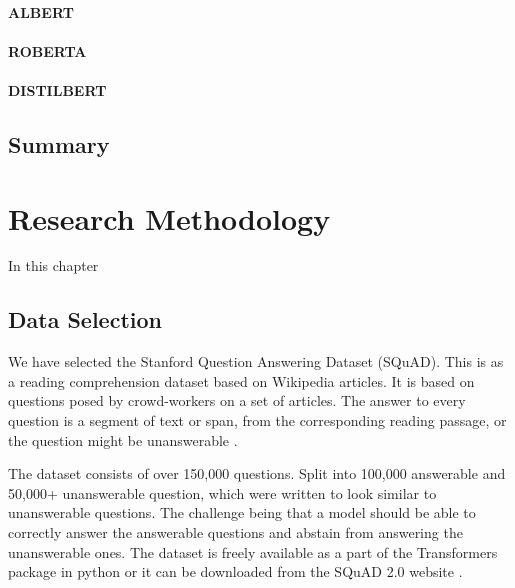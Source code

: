 \documentclass[a4paper,12pt]{report}
\begin{document}
	       \subsubsection{ALBERT}\label{2322}
	       \citep{albert}

	       \subsubsection{ROBERTA}\label{2323}
	       \citep{roberta}

	       \subsubsection{DISTILBERT}\label{2324}
	       \citep{distil}

        \section{Summary}\label{26}


    \chapter{Research Methodology}\label{c3researchmeth}
    
    In this chapter 
    
    \section{Data Selection}\label{c31}

    	We have selected the Stanford Question Answering Dataset (SQuAD). This is as a reading comprehension dataset based on Wikipedia articles. It is based on questions posed by crowd-workers on a set of articles. The answer to every question is a segment of text or span, from the corresponding reading passage, or the question might be unanswerable \citep{dataset}.

    	The dataset consists of over 150,000 questions. Split into 100,000 answerable and 50,000+ unanswerable question, which were written to look similar to unanswerable questions. The challenge being that a model should be able to correctly answer the answerable questions and abstain from answering the unanswerable ones.
	    The dataset is freely available as a part of the Transformers package in python or it can be downloaded from the SQuAD 2.0 website \citep{squad}.
\end{document}
